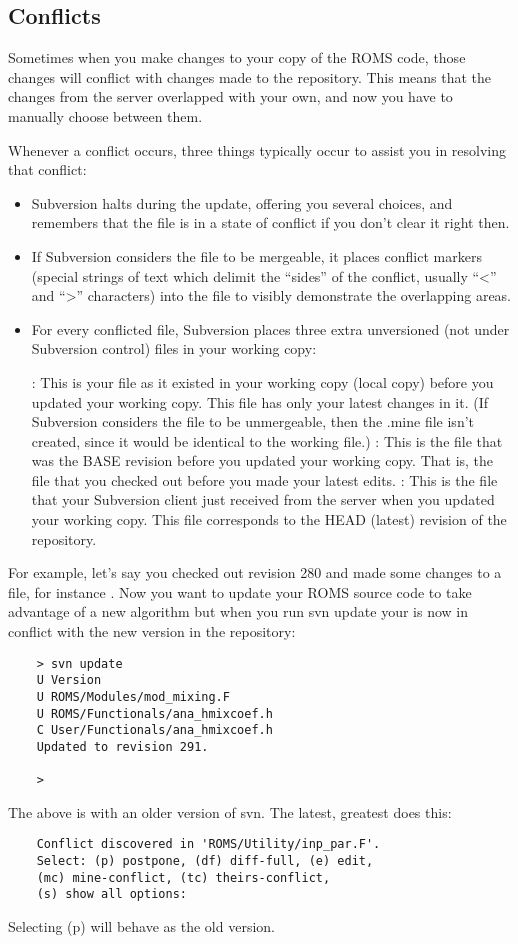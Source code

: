 \subsection{Conflicts}
Sometimes when you make changes to your copy of the ROMS code, those changes
will conflict with changes made to the repository. This means that the
changes from the server overlapped with your own, and now you have to
manually choose between them.

Whenever a conflict occurs, three things typically occur to assist you in
resolving that conflict:
\begin{itemize}
        \item Subversion halts during the update, offering you several choices,
and remembers that the file is in a state of conflict if you don't clear it
right then.
        \item If Subversion considers the file to be mergeable, it places
conflict markers (special strings of text which delimit the ``sides'' of the
conflict, usually ``<'' and ``>'' characters) into the file to visibly
demonstrate the overlapping areas.
        \item For every conflicted file, Subversion places three extra
unversioned (not under Subversion control) files in your working copy: 
\begin{klist}
            : This is your file as it existed
      in your working copy (local copy) before you updated your working
      copy. This file has only your latest changes in it. (If Subversion
      considers the file to be unmergeable, then the .mine file isn't
      created, since it would be identical to the working file.)
            : This is the file that was the
      BASE revision before you updated your working copy. That is,
      the file that you checked out before you made your latest edits.
            : This is the file that your
      Subversion client just received from the server when you updated
      your working copy. This file corresponds to the HEAD (latest)
      revision of the repository.
  \end{klist}
\end{itemize}
For example, let's say you checked out revision 280 and made some changes
to a file, for instance .
Now you want to update your
ROMS source code to take advantage of a new algorithm but when you run
svn update your  is now in conflict with the new
version in the repository:
\begin{verbatim}
    > svn update
    U Version
    U ROMS/Modules/mod_mixing.F
    U ROMS/Functionals/ana_hmixcoef.h
    C User/Functionals/ana_hmixcoef.h
    Updated to revision 291.

    >
\end{verbatim}
The above is with an older version of svn. The latest, greatest does this:
\begin{verbatim}
    Conflict discovered in 'ROMS/Utility/inp_par.F'.
    Select: (p) postpone, (df) diff-full, (e) edit,
    (mc) mine-conflict, (tc) theirs-conflict,
    (s) show all options:
\end{verbatim}
Selecting (p) will behave as the old version.

